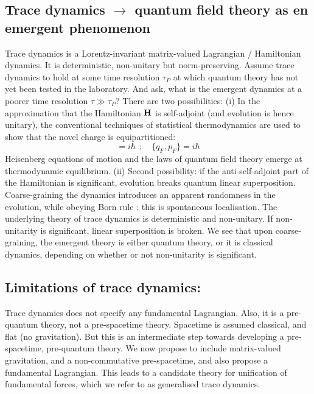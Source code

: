 \documentclass{iopconfser}
\begin{document}
\subsection {Trace dynamics $\longrightarrow$ quantum field theory as en emergent phenomenon}
Trace dynamics  is a Lorentz-invariant matrix-valued Lagrangian / Hamiltonian dynamics. It is deterministic, non-unitary but norm-preserving. Assume trace dynamics to hold at some time resolution $\tau_P$ at which quantum theory has not yet been tested in the laboratory. And ask, what is the emergent dynamics at a poorer time resolution $\tau \gg \tau_P$? There are two possibilities:
(i) In the approximation that  the Hamiltonian $\bf H$ is self-adjoint (and evolution is hence unitary), the conventional techniques of statistical thermodynamics are used to show that the novel charge is equipartitioned:
\begin{equation} [q_B, p_B]=i\hbar \ \ ; \quad \{q_F, p_F\} = i\hbar\end{equation}
 Heisenberg equations of motion and the laws of quantum field theory emerge at thermodynamic equilibrium.
 (ii) Second possibility: if the anti-self-adjoint part of the Hamiltonian is significant, evolution 
   breaks quantum linear superposition.
Coarse-graining the dynamics introduces an apparent randomness in the 
    evolution, while obeying Born rule : this is spontaneous localisation.
The underlying theory of trace dynamics is deterministic and non-unitary.
If non-unitarity is significant, linear superposition is broken.
We see that upon coarse-graining, the emergent theory is either quantum theory, or
    it is classical dynamics, depending on whether or not non-unitarity is significant.
    
    \subsection{Limitations of trace dynamics:} Trace dynamics does not specify any fundamental Lagrangian.
Also, it is a pre-quantum theory, not a pre-spacetime theory.
Spacetime is assumed classical, and flat (no gravitation). But this is an 
    intermediate step towards developing a pre-spacetime, pre-quantum theory.
We now propose to include matrix-valued gravitation, and a non-commutative
     pre-spacetime, and also propose a fundamental Lagrangian.
This leads to a candidate theory for unification of fundamental forces, which we refer to as
generalised trace dynamics. 
\end{document}
